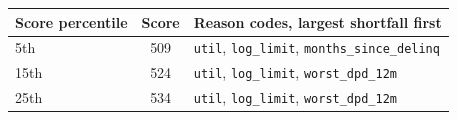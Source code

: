 \begin{tabular}{lcl}
\toprule
Score percentile & Score & Reason codes, largest shortfall first \\
\midrule
5th & 509 & \texttt{util}, \texttt{log\_limit}, \texttt{months\_since\_delinq} \\
15th & 524 & \texttt{util}, \texttt{log\_limit}, \texttt{worst\_dpd\_12m} \\
25th & 534 & \texttt{util}, \texttt{log\_limit}, \texttt{worst\_dpd\_12m} \\
\bottomrule
\end{tabular}
